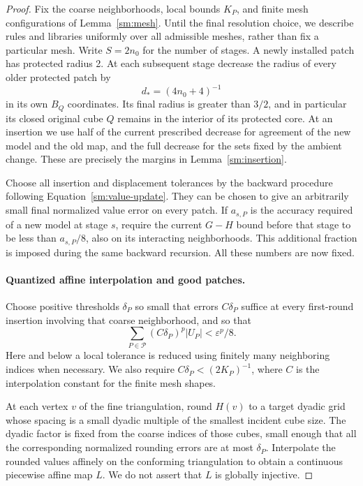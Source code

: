 \documentclass[11pt]{article}
\numberwithin{equation}{section}
\theoremstyle{definition}
\theoremstyle{remark}
\begin{document}
\begin{proof}
Fix the coarse neighborhoods, local bounds $K_P$, and finite
mesh configurations of Lemma~\ref{sm:mesh}.  Until the final resolution
choice, we describe rules and libraries uniformly over all admissible
meshes, rather than fix a particular mesh.  Write
$S=2n_0$ for the number of stages.  A newly installed patch
has protected radius 2.  At each subsequent stage decrease
the radius of every older protected patch by
\begin{equation}
 \label{sm:shrink-size}
 d_*=(4n_0+4)^{-1}
\end{equation}
in its own $B_Q$ coordinates.  Its final radius is greater
than $3/2$, and in particular its closed original cube $Q$
remains in the interior of its protected core.  At an
insertion we use half of the current prescribed decrease
for agreement of the new model and the old map, and the
full decrease for the sets fixed by the ambient change.
These are precisely the margins in
Lemma~\ref{sm:insertion}.

Choose all insertion and displacement tolerances by the
backward procedure following Equation~\eqref{sm:value-update}.
They can be chosen to give an arbitrarily small final
normalized value error on every patch.  If $a_{s,P}$ is
the accuracy required of a new model at stage $s$, require
the current $G-H$ bound before that stage to be less than
$a_{s,P}/8$, also on its interacting neighborhoods.  This
additional fraction is imposed during the same backward
recursion.  All these numbers are now fixed.

\paragraph{Quantized affine interpolation and good patches.}
Choose positive thresholds $\delta_P$ so small that errors
$C\delta_P$ suffice at every first-round insertion involving
that coarse neighborhood, and so that
\begin{equation}
 \label{sm:good-error-budget}
 \sum_{P\in\mathcal P}(C\delta_P)^p |U_P|<\varepsilon^p/8.
\end{equation}
Here and below a local tolerance is reduced using finitely many
neighboring indices when necessary.  We also require
$C\delta_P<(2K_P)^{-1}$, where $C$ is the interpolation
constant for the finite mesh shapes.

At each vertex $v$ of the fine triangulation, round $H(v)$
to a target dyadic grid whose spacing is a small dyadic
multiple of the smallest incident cube size.  The dyadic
factor is fixed from the coarse indices of those cubes,
small enough that all the corresponding normalized
rounding errors are at most $\delta_P$.  Interpolate
the rounded values affinely on the conforming
triangulation to obtain a continuous piecewise affine
map $L$.  We do not assert that $L$ is globally injective.


\end{proof}
\end{document}
